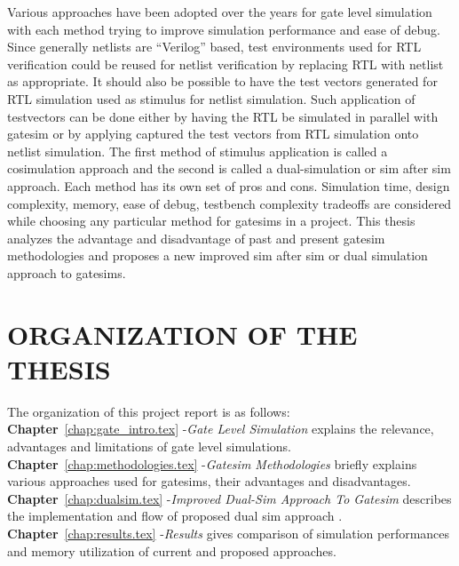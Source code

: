 Various approaches have been adopted over the years for gate level simulation with each method trying to improve simulation performance and ease of debug. Since generally netlists are ``Verilog'' based, test environments used for RTL verification could be reused for netlist verification by replacing RTL with netlist as appropriate. It should also be possible to have the test vectors generated for RTL simulation used as stimulus for netlist simulation. Such application of testvectors can be done either by having the RTL be simulated in parallel with gatesim or by applying captured the test vectors from RTL simulation onto netlist simulation. The first method of stimulus application is called a cosimulation approach and the second is called a dual-simulation or sim after sim approach. Each method has its own set of pros and cons. Simulation time, design complexity, memory, ease of debug, testbench complexity tradeoffs are considered while choosing any particular method for gatesims in a project. This thesis analyzes the advantage and disadvantage of past and present gatesim methodologies and  proposes a new improved sim after sim or dual simulation approach to gatesims. 



\section{ORGANIZATION OF THE THESIS}
The organization of this project report is as follows:\\
\noindent 
{\bf Chapter}~\ref{chap:gate_intro.tex} -{\it Gate Level Simulation} explains the relevance, advantages and limitations of gate level simulations.\\
{\bf Chapter}~\ref{chap:methodologies.tex} -{\it Gatesim Methodologies} briefly explains various approaches used for gatesims, their advantages and disadvantages.\\
{\bf Chapter}~\ref{chap:dualsim.tex} -{\it Improved Dual-Sim Approach To Gatesim} describes the implementation and flow of proposed dual sim approach .\\
{\bf Chapter}~\ref{chap:results.tex} -{\it Results} gives comparison of simulation performances and memory utilization of current and proposed approaches.\\
